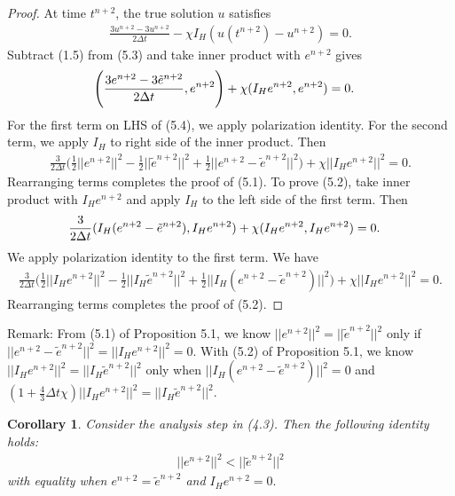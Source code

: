 \documentclass[10pt,a4paper]{amsart}
\newtheorem{corollary}{Corollary}[theorem]
\begin{document}
\begin{proof}
    At time $t^{n+2}$, the true solution $u$ satisfies
    \begin{align}
        \frac{3u^{n+2}-3u^{n+2}}{2\Delta t} -\chi I_H(u(t^{n+2})-u^{n+2})=0.
    \end{align}
    Subtract (1.5) from (5.3) and take inner product with $e^{n+2}$ gives
    \begin{align}
        \Bigg(\frac{3e^{n+2}-3\Tilde{e}^{n+2}}{2\Delta t}, e^{n+2}\Bigg)
        &+\chi (I_He^{n+2}, e^{n+2})=0.
    \end{align}
    For the first term on LHS of (5.4), we apply polarization identity. For the second term, we apply $I_H$ to right side of the inner product. Then
    \begin{align}
        \frac{3}{2\Delta t}\Bigg(\frac{1}{2}||e^{n+2}||^2-\frac{1}{2}||\tilde{e}^{n+2}||^2+\frac{1}{2}||e^{n+2}-\tilde{e}^{n+2}||^2\Bigg)+\chi||I_H e^{n+2}||^2=0.
    \end{align}
    Rearranging terms completes the proof of (5.1). To prove (5.2), take inner product with $I_He^{n+2}$ and apply $I_H$ to the left side of the first term. Then
    \begin{align}
        \frac{3}{2\Delta t}(I_H(e^{n+2}-\Tilde{e}^{n+2}), I_He^{n+2})
        &+\chi (I_He^{n+2}, I_He^{n+2})=0.
    \end{align}
    We apply polarization identity to the first term. We have
    \begin{align}
        \frac{3}{2\Delta t}\Bigg(\frac{1}{2}||I_He^{n+2}||^2-\frac{1}{2}||I_H\tilde{e}^{n+2}||^2+\frac{1}{2}||I_H(e^{n+2}-\tilde{e}^{n+2})||^2\Bigg)+\chi||I_H e^{n+2}||^2=0.
    \end{align}
    Rearranging terms completes the proof of (5.2).
\end{proof}

Remark: From (5.1) of Proposition 5.1, we know $||e^{n+2}||^2=||\tilde{e}^{n+2}||^2$ only if $||e^{n+2}-\tilde{e}^{n+2}||^2=||I_He^{n+2}||^2=0$. With (5.2) of Proposition 5.1, we know $||I_He^{n+2}||^2=||I_H\tilde{e}^{n+2}||^2$ only when $||I_H(e^{n+2}-\tilde{e}^{n+2})||^2=0$ and $(1+\frac{4}{3}\Delta t \chi)||I_He^{n+2}||^2=||I_H\tilde{e}^{n+2}||^2$.

\begin{corollary}
    Consider the analysis step in (4.3). Then the following identity holds:
    \begin{align}
        ||e^{n+2}||^2< ||\tilde{e}^{n+2}||^2
    \end{align} with equality when $e^{n+2}=\tilde{e}^{n+2}$ and $I_He^{n+2}=0.$
\end{corollary}
\end{document}
